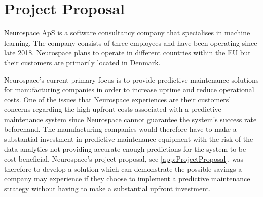 \section{Project Proposal}
Neurospace ApS \cite{Neurospace} is a software consultancy company that specialises in machine learning.
The company consists of three employees and have been operating since late 2018.
Neurospace plans to operate in different countries within the EU but their customers are primarily located in Denmark.

Neurospace’s current primary focus is to provide predictive maintenance solutions for manufacturing companies in order to increase uptime and reduce operational costs.
One of the issues that Neurospace experiences are their customers’ concerns  regarding the high upfront costs associated with a predictive maintenance system since Neurospace cannot guarantee the system’s success rate beforehand.
The manufacturing companies would therefore have to make a substantial investment in predictive maintenance equipment with the risk of the data analytics not providing accurate enough predictions for the system to be cost beneficial.
Neurospace’s project proposal, see \autoref{app:ProjectProposal}, was therefore to develop a solution which can demonstrate the possible savings a company may experience if they choose to implement a predictive maintenance strategy without having to make a substantial upfront investment.
